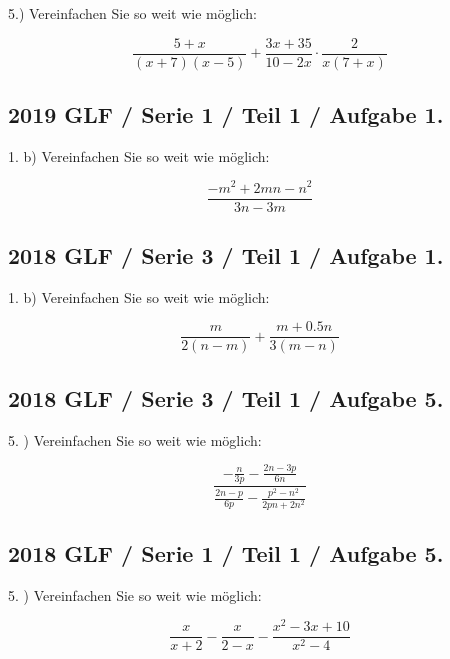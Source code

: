 5.) Vereinfachen Sie so weit wie möglich:

$$\frac{5+x}{(x+7)(x-5)} + \frac{3x+35}{10-2x} \cdot{} \frac2{x(7+x)}$$


\subsection*{2019 GLF / Serie 1 / Teil 1 / Aufgabe 1.}

1. b) Vereinfachen Sie so weit wie möglich:

$$\frac{-m^2+2mn-n^2}{3n-3m}$$



\subsection*{2018 GLF / Serie 3 / Teil 1 / Aufgabe 1.}

1. b) Vereinfachen Sie so weit wie möglich:

$$\frac{m}{2(n-m)} + \frac{m+0.5n}{3(m-n)}$$



\subsection*{2018 GLF / Serie 3 / Teil 1 / Aufgabe 5.}

5. ) Vereinfachen Sie so weit wie möglich:

$$\frac{- \frac{n}{3p} - \frac{2n-3p}{6n}}{\frac{2n-p}{6p} - \frac{p^2-n^2}{2pn+2n^2}}$$


\subsection*{2018 GLF / Serie 1 / Teil 1 / Aufgabe 5.}

5. ) Vereinfachen Sie so weit wie möglich:

$$\frac{x}{x+2} - \frac{x}{2-x} - \frac{x^2-3x+10}{x^2-4}  $$

